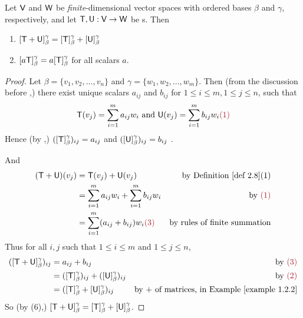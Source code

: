 \begin{theorem} \label{thm 2.8}
Let \(\textsf{V}\) and \(\textsf{W}\) be \emph{finite}-dimensional vector spaces with ordered bases \(\beta\) and \(\gamma\), respectively, and let \(\textsf{T}, \textsf{U}: \textsf{V} \to \textsf{W}\) be \LTRAN{}s.
Then
\begin{enumerate}
\item \([\textsf{T} + \textsf{U}]_{\beta}^{\gamma} = [\textsf{T}]_{\beta}^{\gamma} + [\textsf{U}]_{\beta}^{\gamma}\)
\item \([a\textsf{T}]_{\beta}^{\gamma} = a[\textsf{T}]_{\beta}^{\gamma}\) for all scalars \(a\).
\end{enumerate}
\end{theorem}

\begin{proof}
Let \(\beta = \{ v_1, v_2, ..., v_n \}\) and \(\gamma = \{ w_1, w_2, ..., w_m \}\).
Then (from the discussion before ,) there exist unique scalars \(a_{ij}\) and \(b_{ij}\) for \(1 \le i \le m, 1 \le j \le n\), such that
\[
    \T(v_j) = \sum_{i = 1}^m a_{ij} w_i \text{ and } \U(v_j) = \sum_{i = 1}^m b_{ij} w_i \MAROON{(1)}
\]
Hence (by ,) \(([\textsf{T}]_{\beta}^{\gamma})_{ij} = a_{ij}\) and \(([\textsf{U}]_{\beta}^{\gamma})_{ij} = b_{ij}\) .

And
\begin{align*}
    (\T + \U)(v_j) & = \T(v_j) + \U(v_j) & \text{by \DEF{2.8}(1)} \\
                   & = \sum_{i = 1}^m a_{ij} w_i + \sum_{i = 1}^m b_{ij} w_i & \text{by \MAROON{(1)}} \\
                   & = \sum_{i = 1}^m (a_{ij} + b_{ij}) w_i \MAROON{(3)} & \text{by rules of finite summation}
\end{align*}
Thus for all \(i, j\) such that \(1 \le i \le m\) and \(1 \le j \le n\),
\begin{align*}
    ([\T + \U]_{\beta}^{\gamma})_{ij} & = a_{ij} + b_{ij} & \text{by \MAROON{(3)}} \\
                                      & = ([\T]_{\beta}^{\gamma})_{ij} + ([\U]_{\beta}^{\gamma})_{ij} & \text{by \MAROON{(2)}} \\
                                      & = ([\T]_{\beta}^{\gamma} + [\U]_{\beta}^{\gamma})_{ij} & \text{by \(+\) of matrices, in \EXAMPLE{1.2.2}}
\end{align*}
So (by (6),) \([\textsf{T} + \textsf{U}]_{\beta}^{\gamma} = [\textsf{T}]_{\beta}^{\gamma} + [\textsf{U}]_{\beta}^{\gamma}\).


\end{proof}
